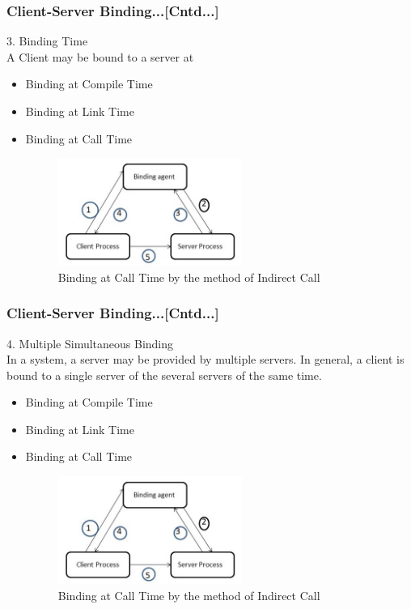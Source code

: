 \documentclass{beamer}
\begin{document}
\begin{frame}
	\frametitle{Client-Server Binding...[Cntd...]}
	\vspace{0.5cm}
	3. Binding Time\\
	\vspace{0.5cm}
	A Client may be bound to a server at
	\vspace{0.5cm}
	\begin{itemize}
		\item Binding at Compile Time
		\item Binding at Link Time
		\item Binding at Call Time
		\begin{figure}
			\centering
			\includegraphics[width=6cm]{fig411.jpg}
			\caption{Binding at Call Time by the method of Indirect Call}
		\end{figure}
	\end{itemize}
\end{frame}


\begin{frame}
	\frametitle{Client-Server Binding...[Cntd...]}
	\vspace{0.3cm}
	4. Multiple Simultaneous Binding\\
	\vspace{0.2cm}
	In a system, a server may be provided by multiple servers. In general, a client is 
	bound to a single server of the several servers of the same time. 

	\begin{itemize}
		\item Binding at Compile Time
		\item Binding at Link Time
		\item Binding at Call Time
		\begin{figure}
			\centering
			\includegraphics[width=6cm]{fig411.jpg}
			\caption{Binding at Call Time by the method of Indirect Call}
		\end{figure}
	\end{itemize}
\end{frame}
\end{document}
